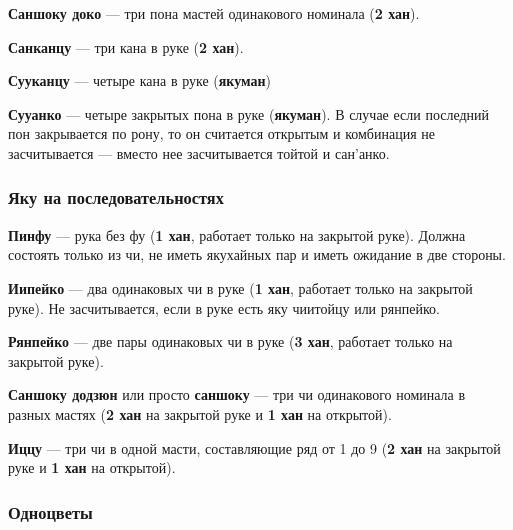 \textbf{Саншоку доко} --- три пона мастей одинакового номинала (\textbf{2 хан}).

 \hfill {}

\textbf{Санканцу} --- три кана в руке (\textbf{2 хан}).

 \hfill {}

\textbf{Сууканцу} --- четыре кана в руке (\textbf{якуман})

 \hfill {}

\textbf{Сууанко} --- четыре закрытых пона в руке (\textbf{якуман}). В случае если последний пон закрывается по рону, то он считается открытым и комбинация не засчитывается --- вместо нее засчитывается тойтой и сан'анко.


\subsubsection{Яку на последовательностях}

\textbf{Пинфу} --- рука без фу (\textbf{1 хан}, работает только на закрытой руке). Должна состоять только из чи, не иметь якухайных пар и иметь ожидание в две стороны.


\textbf{Иипейко} --- два одинаковых чи в руке (\textbf{1 хан}, работает только на закрытой руке). Не засчитывается, если в руке есть яку чиитойцу или рянпейко.


\textbf{Рянпейко} --- две пары одинаковых чи в руке (\textbf{3 хан}, работает только на закрытой руке).


\textbf{Саншоку додзюн} или просто \textbf{саншоку} --- три чи одинакового номинала в разных мастях (\textbf{2 хан} на закрытой руке и \textbf{1 хан} на открытой).

 \hfill {}

\textbf{Иццу} --- три чи в одной масти, составляющие ряд от 1 до 9 (\textbf{2 хан} на закрытой руке и \textbf{1 хан} на открытой).

 \hfill {}

\subsubsection{Одноцветы}

